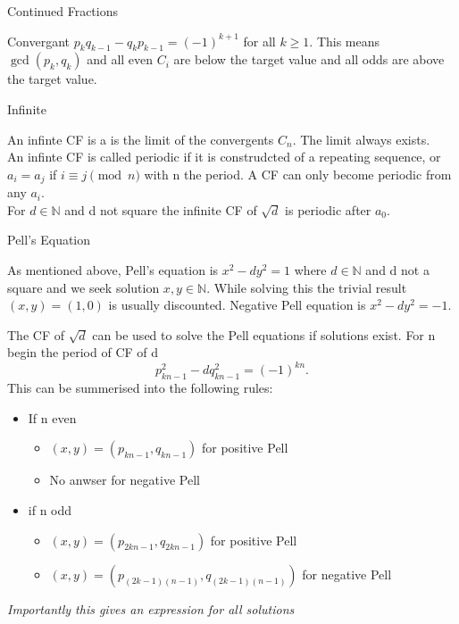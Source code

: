 \documentclass[12pt, letterpaper]{article}
\begin{document}
\begin{section}{Continued Fractions}
\begin{subsection}{Convergant}
    \(p_{k}q_{k - 1} - q_{k}p_{k - 1} = (-1)^{k + 1}\) for all \(k \geq 1\).
    This means \(\gcd(p_{k}, q_{k})\) and all even \(C_{i}\) are below the target
    value and all odds are above the target value.

  \end{subsection}

  \begin{subsection}{Infinite}

    An infinte CF is a is the limit of the convergents \(C_{n}\). The limit
    always exists. \\
    An infinte CF is called periodic if it is construdcted of a repeating
    sequence, or \(a_{i} = a_{j}\) if \(i \equiv j \pmod{n}\) with n the period.
    A CF can only become periodic from any \(a_{i}\). \\
    For \(d \in \mathbb{N}\) and d not square the infinite CF of \(\sqrt{d}\)
    is periodic after \(a_{0}\).

  \end{subsection}

  \begin{subsection}{Pell's Equation}

    As mentioned above, Pell's equation is \(x^{2} - dy^{2} = 1\) where
    \(d \in \mathbb{N}\) and d not a square and we seek solution \(x, y \in  \mathbb{N}\).
    While solving this the trivial result \((x, y) = (1, 0)\) is usually discounted.
    Negative Pell equation is \(x^{2} - dy^{2} = -1\).

    The CF of \(\sqrt{d}\) can be used to solve the Pell equations if solutions
    exist. For n begin the period of CF of d \[p^{2}_{kn - 1} - dq^{2}_{kn - 1} = (-1)^{kn}.\]
    This can be summerised into the following rules:
    \begin{itemize}
      \item If n even
            \begin{itemize}
              \item \((x, y) = (p_{kn - 1}, q_{kn - 1})\) for positive Pell
              \item No anwser for negative Pell
            \end{itemize}
      \item if n odd
            \begin{itemize}
              \item \((x, y) = (p_{2kn - 1}, q_{2kn - 1})\) for positive Pell
              \item \((x, y) = (p_{(2k - 1)(n - 1)}, q_{(2k - 1)(n - 1)})\) for negative Pell
            \end{itemize}
    \end{itemize}

    \emph{Importantly this gives an expression for all solutions}

  \end{subsection}

\end{section}
\end{document}
